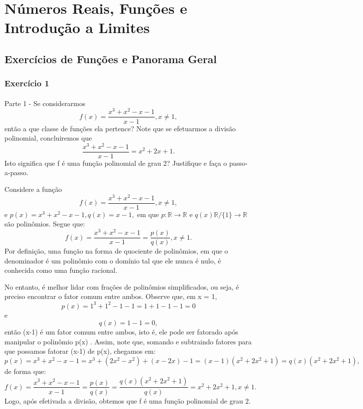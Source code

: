 \documentclass[exercícios_de_cálculo.tex]{subfiles}
\begin{document}
\section{Números Reais, Funções e Introdução a Limites}
\subsection{Exercícios de Funções e Panorama Geral}
\subsubsection{Exercício 1}
\paragraph{}Parte 1 - Se considerarmos
$$
	f(x) = \frac{x^3 + x^2 - x - 1}{x-1}, x\neq{1},
$$
então a que classe de funções ela pertence? Note que se efetuarmos a divisão polinomial, concluiremos que
$$
	\frac{x^3 + x^2 - x - 1}{x-1} = x^2 + 2x + 1.
$$
Isto significa que f é uma função polinomial de grau 2? Justifique e faça o passo-a-passo.
\begin{proof*}
	Considere a função
	$$
		f(x) = \frac{x^3 + x^2 - x - 1}{x-1}, x\neq{1},
	$$
	e $p(x) = x^3 + x^2 - x - 1, q(x) = x - 1,$ em que $p:\mathbb{R}\rightarrow\mathbb{R}$ e $q(x)\mathbb{R}/\{1\}\rightarrow\mathbb{R}$ são polinômios. Segue que:
	$$
		f(x) = \frac{x^3 + x^2 - x - 1}{x-1} = \frac{p(x)}{q(x)}, x\neq{1}.
	$$
	Por definição, uma função na forma de quociente de polinômios, em que o denominador é um polinômio com o domínio tal que ele nunca é nulo, é conhecida como uma funç\~ao racional.

	No entanto, é melhor lidar com frações de polinômios simplificados, ou seja, é preciso encontrar o fator comum entre ambos. Observe que, em x = 1,
	$$
		p(x) = 1^3 + 1^2 - 1 - 1 = 1 + 1 - 1 - 1 = 0
	$$
	e
	$$
		q(x) = 1 - 1 = 0,
	$$
	então (x-1) é um fator comum entre ambos, isto é, ele pode ser fatorado após manipular o polinômio p(x) . Assim, note que, somando e subtraindo fatores para que possamos fatorar (x-1) de p(x), chegamos em:
	$$
		p(x) = x^3 + x^2 - x - 1 = x^3 + (2x^2 - x^2) +(x - 2x) -1 = (x-1)(x^2 + 2x^2 + 1) = q(x)(x^2 + 2x^2 + 1),
	$$
	de forma que:
	$$
		f(x) = \frac{x^3 + x^2 - x - 1}{x-1} = \frac{p(x)}{q(x)} = \frac{q(x)(x^2 + 2x^2 + 1)}{q(x)} = x^2 + 2x^2 + 1, x\neq{1}.
	$$
	Logo, após efetivada a divisão, obtemos que f é uma função polinomial de grau 2.
	\qedsymbol
\end{proof*}
\end{document}
